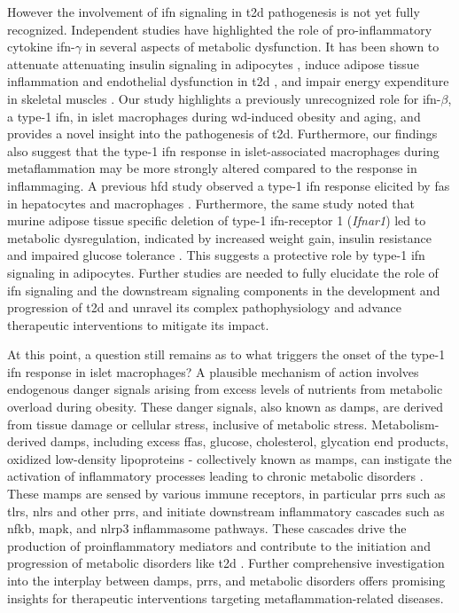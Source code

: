 \par However the involvement of \gls{ifn} signaling in \gls{t2d} pathogenesis is not yet fully recognized. Independent studies have highlighted the role of pro-inflammatory cytokine \gls{ifn}-$\gamma$ in several aspects of metabolic dysfunction. It has been shown to attenuate attenuating insulin signaling in adipocytes \textbf{\cite{mcgillicuddy_interferon_2009}}, induce adipose tissue inflammation and endothelial dysfunction in \gls{t2d} \textbf{\cite{zhang_interferon-gamma_2011}}, and impair energy expenditure in skeletal muscles \textbf{\cite{li_interferon_2012}}. Our study highlights a previously unrecognized role for \gls{ifn}-$\beta$, a type-1 \gls{ifn}, in islet macrophages during \gls{wd}-induced obesity and aging, and provides a novel insight into the pathogenesis of \gls{t2d}. Furthermore, our findings also suggest that the type-1 \gls{ifn} response in islet-associated macrophages during metaflammation may be more strongly altered compared to the response in inflammaging. A previous \gls{hfd} study observed a type-1 \gls{ifn} response elicited by \glspl{fa} in hepatocytes and macrophages \textbf{\cite{wieser_adipose_2018}}. Furthermore, the same study noted that murine adipose tissue specific deletion of type-1 \gls{ifn}-receptor 1 (\textit{Ifnar1}) led to metabolic dysregulation, indicated by increased weight gain, insulin resistance and impaired glucose tolerance \textbf{\cite{wieser_adipose_2018}}. This suggests a protective role by type-1 \gls{ifn} signaling in adipocytes. Further studies are needed to fully elucidate the role of \gls{ifn} signaling and the downstream signaling components in the development and progression of \gls{t2d} and unravel its complex pathophysiology and advance therapeutic interventions to mitigate its impact.\\

\par At this point, a question still remains as to what triggers the onset of the type-1 \gls{ifn} response in islet macrophages? A plausible mechanism of action involves endogenous danger signals arising from excess levels of nutrients from metabolic overload during obesity. These danger signals, also known as \glspl{damp}, are derived from tissue damage or cellular stress, inclusive of metabolic stress. Metabolism-derived \glspl{damp}, including excess \glspl{ffa}, glucose, cholesterol, glycation end products, oxidized low-density lipoproteins -  collectively known as \glspl{mamp}, can instigate the activation of inflammatory processes leading to chronic metabolic disorders \textbf{\cite{wang_metabolism-associated_2020}}. These \glspl{mamp} are sensed by various immune receptors, in particular \glspl{prr} such as \glspl{tlr}, \glspl{nlr} and other \glspl{prr}, and initiate downstream inflammatory cascades such as \gls{nfkb}, \gls{mapk}, and \gls{nlrp3} inflammasome pathways. These cascades drive the production of proinflammatory mediators and contribute to the initiation and progression of metabolic disorders like \gls{t2d} \textbf{\cite{wang_metabolism-associated_2020}}. Further comprehensive investigation into the interplay between \glspl{damp}, \glspl{prr}, and metabolic disorders offers promising insights for therapeutic interventions targeting metaflammation-related diseases.

